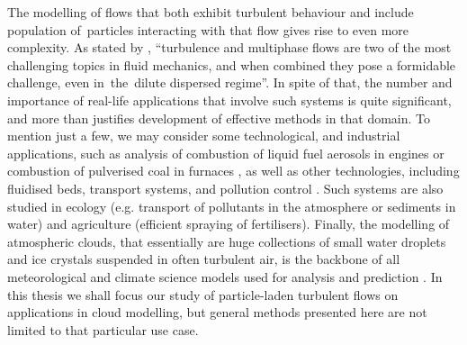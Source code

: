 \documentclass{pracamgren}
\begin{document}
The modelling of flows that both exhibit turbulent behaviour and include population of~particles interacting with that flow gives rise to even more complexity.
As stated by \textcite{Balachandar2010}, ``turbulence and multiphase flows are two of the most challenging topics in fluid mechanics, and when combined they pose a formidable challenge, even in~the~dilute dispersed regime''.
In spite of that, the number and importance of real-life applications that involve such systems is quite significant, and more than justifies development of effective methods in that domain.
To mention just a few, we may consider some technological, and industrial applications, such as analysis of combustion of liquid fuel aerosols in engines or combustion of pulverised coal in furnaces \parencite{Zheng2020}, as well as other technologies, including fluidised beds, transport systems, and pollution control \parencite[4-17]{Crowe2012}.
Such systems are also studied in ecology (e.g. transport of pollutants in the atmosphere or sediments in water) and agriculture (efficient spraying of fertilisers).
Finally, the modelling of atmospheric clouds, that essentially are huge collections of small water droplets and ice crystals suspended in often turbulent air, is the backbone of all meteorological and climate science models used for analysis and prediction \parencite{Devenish2012, Grabowski2013}.
In this thesis we shall focus our study of particle-laden turbulent flows on applications in cloud modelling, but general methods presented here are not limited to that particular use case.
\end{document}
